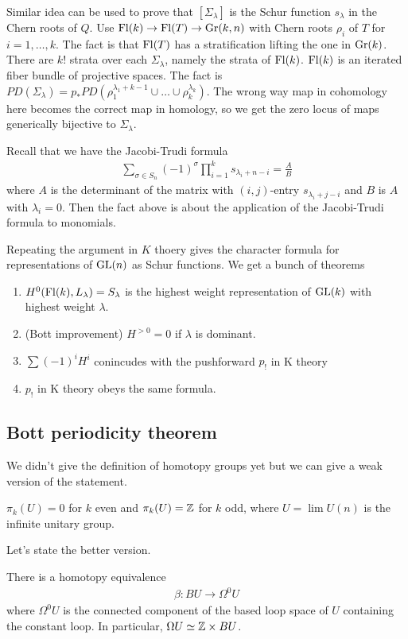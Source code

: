 \documentclass[12pt]{article}
\begin{document}
\begin{remark}
    Similar idea can be used to prove that $[\Sigma_\lambda]$ is the Schur function $s_\lambda$ in the Chern roots of $Q$. Use $\operatorname{Fl}(k) \to \operatorname{Fl}(T) \to \operatorname{Gr}(k,n)$ with Chern roots $\rho_i$ of $T$ for $i=1,\dots, k$. The fact is that $\operatorname{Fl}(T)$ has a stratification lifting the one in $\operatorname{Gr}(k)$. There are $k!$ strata over each $\Sigma_\lambda$, namely the strata of $\operatorname{Fl}(k)$. $\operatorname{Fl}(k)$ is an iterated fiber bundle of projective spaces. The fact is $PD(\Sigma_\lambda) = p_* PD(\rho_1^{\lambda_1 + k - 1} \cup \dots \cup \rho_k^{\lambda_k})$. The wrong way map in cohomology here becomes the correct map in homology, so we get the zero locus of maps generically bijective to $\Sigma_\lambda$.
\end{remark}

Recall that we have the Jacobi-Trudi formula \begin{align*}
    \sum_{\sigma\in S_n} (-1)^\sigma \prod_{i=1}^k s_{\lambda_i + n - i} = \frac{A}{B}
\end{align*} where $A$ is the determinant of the matrix with $(i,j)$-entry $s_{\lambda_i + j - i}$ and $B$ is $A$ with $\lambda_i = 0$. Then the fact above is about the application of the Jacobi-Trudi formula to monomials. 

Repeating the argument in $K$ thoery gives the character formula for representations of $\operatorname{GL}(n)$ as Schur functions. We get a bunch of theorems \begin{theorem}
    \begin{enumerate}
        \item $H^0(\operatorname{Fl}(k), L_\lambda) = S_\lambda$ is the highest weight representation of $\operatorname{GL}(k)$ with highest weight $\lambda$.
        \item (Bott improvement) $H^{>0} = 0$ if $\lambda$ is dominant.
        \item $\sum (-1)^i H^i$ conincudes with the pushforward $p_!$ in K theory
        \item $p_!$ in K theory obeys the same formula.
    \end{enumerate}
\end{theorem}

\subsection{Bott periodicity theorem}
We didn't give the definition of homotopy groups yet but we can give a weak version of the statement.

\begin{theorem}
    $\pi_k(U) = 0$ for $k$ even and $\pi_k(U) = \mathbb{Z}$ for $k$ odd, where $U = \lim U(n)$ is the infinite unitary group.
\end{theorem}
Let's state the better version.
\begin{theorem}
    There is a homotopy equivalence \begin{align*}
        \beta: BU \to \Omega^0 U
    \end{align*} where $\Omega^0 U$ is the connected component of the based loop space of $U$ containing the constant loop. In particular, $\Omega U \simeq \mathbb{Z} \times BU$.
\end{theorem}
\end{document}
